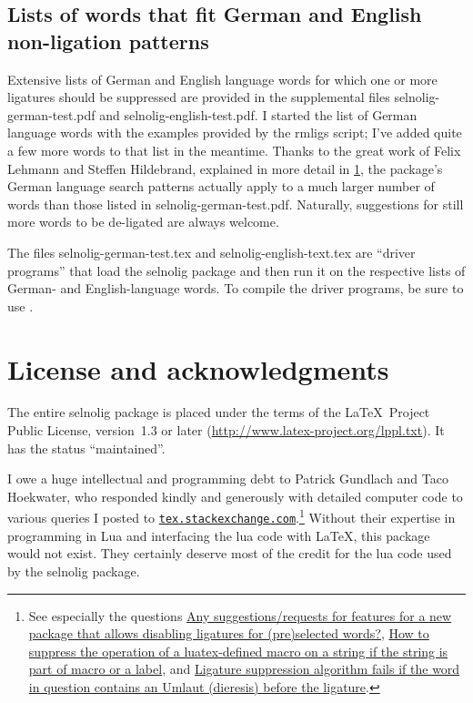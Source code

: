 \documentclass[11pt]{article}
\newcommand{\pkg}[1]{\textsf{#1}}
\begin{document}
\subsection{Lists of words that fit German and English non-ligation patterns}

Extensive lists of German and English language words for which one or more ligatures should be suppressed are provided in the supplemental files \pkg{selnolig-german-test.pdf} and \pkg{selnolig-english-test.pdf}. I started the list of German language words with the examples provided by the \pkg{rmligs} script; I've added quite a few more words to that list in the meantime. Thanks to the great work of Felix Lehmann and Steffen Hildebrand, explained in more detail in \cref{sec:thanks}, the package's German language search patterns actually apply to a much larger number of words than those listed in \pkg{selnolig-german-test.pdf}. Naturally, suggestions for still more words to be de-ligated are always welcome.

The files \pkg{selnolig-german-test.tex} and \pkg{selnolig-english-text.tex} are \enquote{driver programs} that load the \pkg{selnolig} package and then run it on the respective lists of German- and English-language words. To compile the driver programs, be sure to use \LuaLaTeX.

\section{License and acknowledgments} \label{sec:thanks}

The entire \pkg{selnolig} package is placed under the terms of the \LaTeX\ Project Public License, version~1.3 or later (\url{http://www.latex-project.org/lppl.txt}).
It has the status \enquote{maintained}.

I owe a huge intellectual and programming debt to Patrick Gundlach and Taco Hoekwater, who responded kindly and generously with detailed computer code to various queries I posted to \href{http://tex.stackexchange.com}{\texttt{tex.stackexchange.com}}.\footnote{See especially the questions \href{http://tex.stackexchange.com/q/37443/5001}{Any suggestions/requests for features for a new package that allows disabling ligatures for (pre)selected words?}, \href{http://tex.stackexchange.com/q/48516/5001}{How to suppress the operation of a luatex-defined macro on a string if the string is part of macro or a label}, and \href{http://tex.stackexchange.com/q/63005/5001}{Ligature suppression algorithm fails if the word in question contains an Umlaut (dieresis) before the ligature}.} Without their expertise in programming in Lua and interfacing the lua code with \LaTeX, this package would not exist. They certainly deserve most of the credit for the lua code used by the \pkg{selnolig} package.
\end{document}
